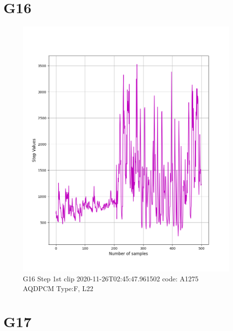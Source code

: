 \documentclass[hidelinks, 12pt, a4paper]{article}
\begin{document}
\section{G16}

\begin{figure}[h!]
\centering
	\includegraphics[height=.4\textheight, width=\textwidth]{assets/session1/g16.png}
    \caption{G16 Step 1st clip  2020-11-26T02:45:47.961502 code: A1275 AQDPCM Type:F, L22}
\end{figure}

\section{G17}
\end{document}
